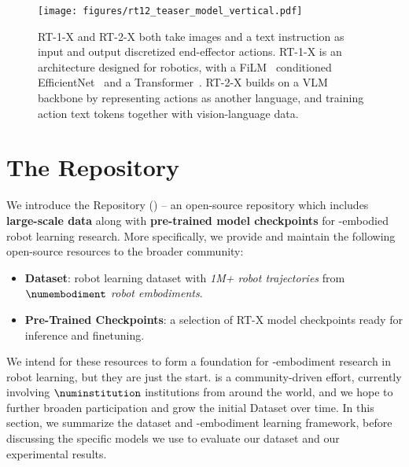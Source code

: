\begin{figure*}[h]
    \centering
    \texttt{[image: figures/rt12\_teaser\_model\_vertical.pdf]}
    \vspace{-0.1em}
    \caption{
    \small RT-1-X and RT-2-X both take images and a text instruction as input and output discretized end-effector actions. 
    RT-1-X is an architecture designed for robotics, with a FiLM~\cite{perez2017film} conditioned EfficientNet~\cite{tan2019efficientnet} and a Transformer~\cite{vaswani2017attention}.
    RT-2-X builds on a VLM backbone by representing actions as another language, and training action text tokens together with vision-language data.
    }
\label{fig:rt12}
\vspace{-1.8em}
\end{figure*}

\vspace{-0.3em}
\section{The \repo Repository}
\vspace{-0.02em}

We introduce the \repo Repository (\repourl) -- an open-source repository which includes \textbf{large-scale data} along with \textbf{pre-trained model checkpoints} for \cro-embodied robot learning research. More specifically, we provide and maintain the following open-source resources to the broader community: 
\begin{itemize}
    \item \textbf{\repo Dataset}: robot learning dataset with \emph{1M+ robot trajectories} from \emph{$\numembodiment$ robot embodiments}.
    \item \textbf{Pre-Trained Checkpoints}: a selection of RT-X model checkpoints ready for inference and finetuning.
\end{itemize}
\vspace{-0.2em}
We intend for these resources to form a foundation for \cro-embodiment research in robot learning, but they are just the start. \repo is a community-driven effort, currently involving $\numinstitution$ institutions from around the world, and we hope to further broaden participation and grow the initial \repo Dataset over time. In this section, we summarize the dataset and \cro-embodiment learning framework, before discussing the specific models we use to evaluate our dataset and our experimental results.

\vspace{-0.3em}
